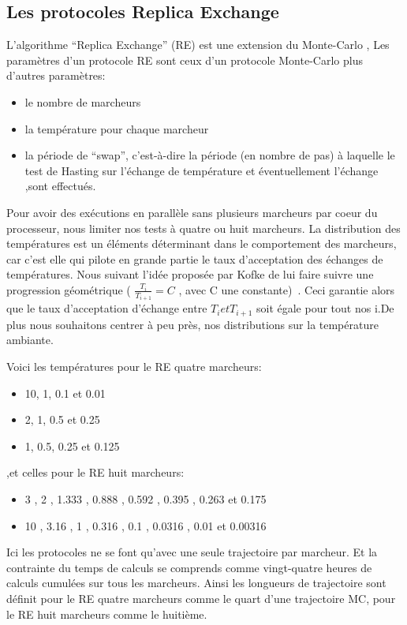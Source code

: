    \subsection{Les protocoles Replica Exchange} 

L'algorithme ``Replica Exchange'' (RE) est une extension du Monte-Carlo , Les paramètres d'un protocole RE sont ceux d'un protocole Monte-Carlo plus d'autres paramètres:

\begin{itemize}
\item le nombre de marcheurs
\item la température pour chaque marcheur
\item la période de ``swap'', c'est-à-dire la période  (en nombre de pas) à  laquelle le test de Hasting sur l'échange de température et éventuellement l'échange ,sont effectués.
\end{itemize}
Pour avoir des exécutions en parallèle sans plusieurs marcheurs  par coeur du processeur, nous limiter nos tests à quatre ou huit marcheurs.
La distribution des températures est un éléments déterminant dans le comportement des marcheurs, car c'est elle qui pilote en grande partie le taux d'acceptation des échanges de températures. Nous suivant l'idée proposée par Kofke de lui faire suivre une progression géométrique ( $ \frac{T_i}{T_{i+1}}=C $ , avec C une constante)~\citep{refRE1,refRE2,refRE3}. Ceci garantie alors que le taux d'acceptation d'échange entre $T_i et T_{i+1}$ soit égale pour tout nos i.De plus nous souhaitons centrer à peu près, nos distributions sur la température ambiante.

Voici les températures pour le RE quatre marcheurs:

\begin{itemize} 
\item 10, 1, 0.1 et 0.01
\item 2, 1, 0.5 et 0.25 
\item 1, 0.5, 0.25 et 0.125
\end{itemize} 

,et celles pour le RE huit marcheurs:

\begin{itemize} 
\item 3 , 2 , 1.333 , 0.888 , 0.592 , 0.395 , 0.263 et 0.175 
\item 10 , 3.16 , 1 , 0.316 , 0.1 , 0.0316 , 0.01 et 0.00316
\end{itemize} 

Ici les protocoles ne se font qu'avec une seule trajectoire par marcheur. Et la contrainte du temps de calculs se comprends comme vingt-quatre heures de calculs cumulées sur tous les marcheurs.
Ainsi les longueurs de trajectoire sont définit pour le RE quatre marcheurs comme le quart d'une trajectoire MC, pour le RE huit marcheurs comme le huitième.

